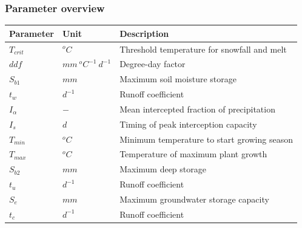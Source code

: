 \subsubsection{Parameter overview}
\begin{table}[htbp]
  \centering
    \begin{tabular}{lll}
    \toprule
    Parameter & Unit  & Description \\
    \midrule
    $T_{crit}$ & $^oC$ & Threshold temperature for snowfall and melt \\
    $ddf$ & $mm~^oC^{-1}~d^{-1}$ & Degree-day factor \\
    $S_{b1}$ & $mm$  & Maximum soil moisture storage \\
    $t_w$ & $d^{-1}$ & Runoff coefficient \\
    $I_{\alpha}$ & $-$   & Mean intercepted fraction of precipitation \\
    $I_{s}$ & $d$   & Timing of peak interception capacity \\
    $T_{min}$ & $^oC$ & Minimum temperature to start growing season \\
    $T_{max}$ & $^oC$ & Temperature of maximum plant growth \\
    $S_{b2}$ & $mm$  & Maximum deep storage \\
    $t_u$ & $d^{-1}$ & Runoff coefficient \\
    $S_e$ & $mm$  & Maximum groundwater storage capacity \\
    $t_c$ & $d^{-1}$ & Runoff coefficient \\
    \bottomrule
    \end{tabular}%
  \label{tab:addlabel}%
\end{table}%

